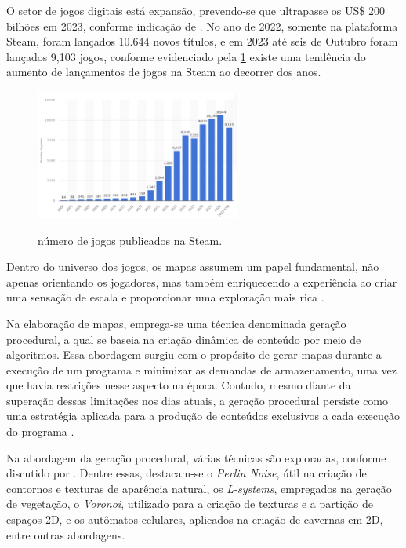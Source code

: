 
O setor de jogos digitais está expansão, prevendo-se que ultrapasse os US\$ 200 bilhões em 2023, conforme indicação de . No ano de 2022, somente na plataforma Steam, foram lançados 10.644 novos títulos, e em 2023 até seis de Outubro foram lançados 9,103 jogos, conforme evidenciado pela \cref{fig:steam_publishes} existe uma tendência do aumento de lançamentos de jogos na Steam ao decorrer dos anos.


\begin{figure}[!ht]
	\centering
    \caption{número de jogos publicados na Steam.}
	\includegraphics[width=0.6\textwidth]{figures/steam_sales.png}
	\label{fig:steam_publishes}
\end{figure}

Dentro do universo dos jogos, os mapas assumem um papel fundamental, não apenas orientando os jogadores, mas também enriquecendo a experiência ao criar uma sensação de escala e proporcionar uma exploração mais rica \space\cite{video_game_maps, minimap}.

Na elaboração de mapas, emprega-se uma técnica denominada geração procedural, a qual se baseia na criação dinâmica de conteúdo por meio de algoritmos. Essa abordagem surgiu com o propósito de gerar mapas durante a execução de um programa e minimizar as demandas de armazenamento, uma vez que havia restrições nesse aspecto na época. Contudo, mesmo diante da superação dessas limitações nos dias atuais, a geração procedural persiste como uma estratégia aplicada para a produção de conteúdos exclusivos a cada execução do programa \cite{kenny2021procedural, lambda3}.

Na abordagem da geração procedural, várias técnicas são exploradas, conforme discutido por . Dentre essas, destacam-se o \textit{Perlin Noise}, útil na criação de contornos e texturas de aparência natural, os \textit{L-systems}, empregados na geração de vegetação, o \textit{Voronoi}, utilizado para a criação de texturas e a partição de espaços 2D, e os autômatos celulares, aplicados na criação de cavernas em 2D, entre outras abordagens.

